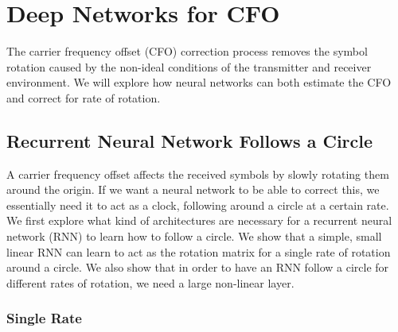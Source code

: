 \chapter{Deep Networks for CFO}

The carrier frequency offset (CFO) correction process removes the symbol rotation caused by the non-ideal conditions of the transmitter and receiver environment.  We will explore how neural networks can both estimate the CFO and correct for rate of rotation.

\section{Recurrent Neural Network Follows a Circle}

A carrier frequency offset affects the received symbols by slowly rotating them around the origin.  If we want a neural network to be able to correct this, we essentially need it to act as a clock, following around a circle at a certain rate.
We first explore what kind of architectures are necessary for a recurrent neural network (RNN) to learn how to follow a circle.
We show that a simple, small linear RNN can learn to act as the rotation matrix for a single rate of rotation around a circle.
We also show that in order to have an RNN follow a circle for different rates of rotation, we need a large non-linear layer.

\subsection{Single Rate}


